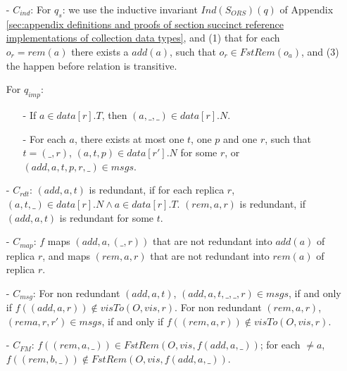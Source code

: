 \begin{itemize}
\setlength{\itemsep}{0.5pt}
\item[-] $C_{\mathit{ind}}$: For $q_s$: we use the inductive invariant $\mathit{Ind}(S_{\mathit{ORS}})(q)$ of Appendix \ref{sec:appendix definitions and proofs of section succinct reference implementations of collection data types}, and (1) that for each $o_r = \mathit{rem}(a)$ there exists a $\mathit{add}(a)$, such that $o_r \in \mathit{FstRem}(o_a)$, and (3) the happen before relation is transitive.
    
    For $q_{\mathit{imp}}$:

    \begin{itemize}
    \setlength{\itemsep}{0.5pt}
    \item[-] If $a \in \mathit{data}[r].T$, then $(a,\_,\_) \in \mathit{data}[r].N$. 
    
    \item[-] For each $a$, there exists at most one $t$, one $p$ and one $r$, such that $t = (\_,r)$, $(a,t,p) \in \mathit{data}[r'].N$ for some $r$, or $(\mathit{add},a,t,p,r,\_) \in \mathit{msgs}$. 
    
    \end{itemize}

\item[-] $C_{\mathit{rdt}}$: $(\mathit{add},a,t)$ is redundant, if for each replica $r$, $(a,t,\_) \in \mathit{data}[r].N \wedge a \in \mathit{data}[r].T$. $(\mathit{rem},a,r)$ is redundant, if $(\mathit{add},a,t)$ is redundant for some $t$. 

\item[-] $C_{\mathit{map}}$: $f$ maps $(\mathit{add},a,(\_,r))$ that are not redundant into $\mathit{add}(a)$ of replica $r$, and maps $(\mathit{rem},a,r)$ that are not redundant into $\mathit{rem}(a)$ of replica $r$.

\item[-] $C_{\mathit{msg}}$: For non redundant $(\mathit{add},a,t)$, $(\mathit{add},a,t,\_,\_,r) \in \mathit{msgs}$, if and only if $f((\mathit{add},a,r)) \notin \mathit{visTo}(O,\mathit{vis},r)$. For non redundant $(\mathit{rem},a,r)$, $(\mathit{rem}a,r,r') \in \mathit{msgs}$, if and only if $f((\mathit{rem},a,r)) \notin \mathit{visTo}(O,\mathit{vis},r)$. 

\item[-] $C_{\mathit{FM}}$: $f((\mathit{rem},a,\_)) \in \mathit{FstRem}(O,\mathit{vis},f( \mathit{add},a,\_ ))$; for each $ \neq a$, $f((\mathit{rem},b,\_)) \notin \mathit{FstRem}(O,\mathit{vis},f( \mathit{add},a,\_ ))$. 


\end{itemize}
